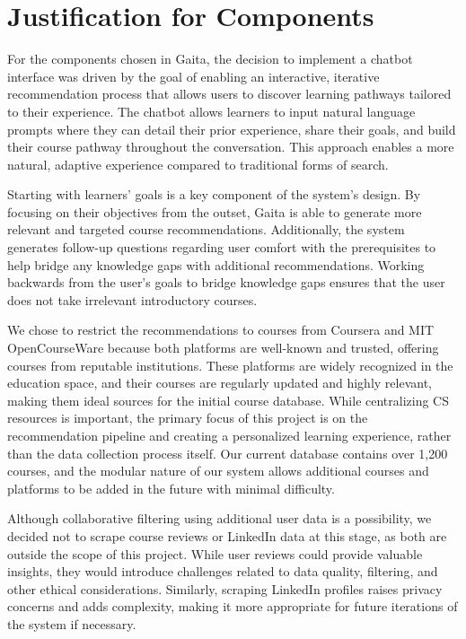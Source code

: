 \section{Justification for Components} 
For the components chosen in Gaita, the decision to implement a chatbot interface was driven by the goal of enabling an interactive, iterative recommendation process that allows users to discover learning pathways tailored to their experience. The chatbot allows learners to input natural language prompts where they can detail their prior experience, share their goals, and build their course pathway throughout the conversation. This approach enables a more natural, adaptive experience compared to traditional forms of search. 

Starting with learners' goals is a key component of the system's design. By focusing on their objectives from the outset, Gaita is able to generate more relevant and targeted course recommendations. Additionally, the system generates follow-up questions regarding user comfort with the prerequisites to help bridge any knowledge gaps with additional recommendations. Working backwards from the user’s goals to bridge knowledge gaps ensures that the user does not take irrelevant introductory courses. 

We chose to restrict the recommendations to courses from Coursera and MIT OpenCourseWare because both platforms are well-known and trusted, offering courses from reputable institutions. These platforms are widely recognized in the education space, and their courses are regularly updated and highly relevant, making them ideal sources for the initial course database. While centralizing CS resources is important, the primary focus of this project is on the recommendation pipeline and creating a personalized learning experience, rather than the data collection process itself. Our current database contains over 1,200 courses, and the modular nature of our system allows additional courses and platforms to be added in the future with minimal difficulty. 

Although collaborative filtering using additional user data is a possibility, we decided not to scrape course reviews or LinkedIn data at this stage, as both are outside the scope of this project. While user reviews could provide valuable insights, they would introduce challenges related to data quality, filtering, and other ethical considerations. Similarly, scraping LinkedIn profiles raises privacy concerns and adds complexity, making it more appropriate for future iterations of the system if necessary.

